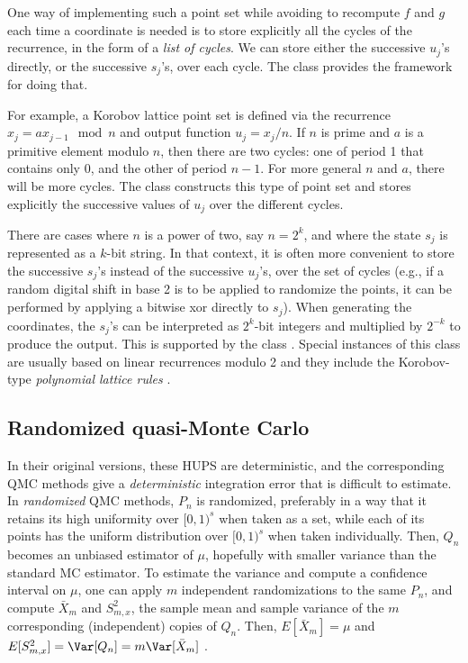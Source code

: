 One way of implementing such a point set while avoiding to recompute
$f$ and $g$ each time a coordinate is needed is to store explicitly
all the cycles of the recurrence, in the form of a \emph{list of cycles}.
We can store either the successive $u_j$'s directly, or the successive
$s_j$'s, over each cycle.
The class 
 provides the framework for doing that.

For example, a Korobov lattice point set is defined via the recurrence
$x_j = a x_{j-1} \mod n$ and output function $u_j = x_j/n$.
If $n$ is prime and $a$ is a primitive element modulo $n$, then there
are two cycles: one of period 1 that contains only 0, and
the other of period $n-1$.
For more general $n$ and $a$, there will be more cycles.
The class  
 constructs this type of point set and
stores explicitly the successive values of $u_j$ over the different cycles.

There are cases where $n$ is a power of two, say $n = 2^k$,
and where the state $s_j$ is represented as a $k$-bit string.
In that context, it is often more convenient to store the successive
$s_j$'s instead of the successive $u_j$'s, over the set of cycles
(e.g., if a random digital shift in base 2 is to be applied to
randomize the points, it can be performed by applying a bitwise xor
directly to $s_j$).
When generating the coordinates, the $s_j$'s can be interpreted as
$2^k$-bit integers and multiplied by $2^{-k}$ to produce the output.
This is supported by the class
 .
Special instances of this class are usually based on
linear recurrences modulo 2 and they include the Korobov-type
\emph{polynomial lattice rules}
\cite{rLEC99a,vLEC99a,rLEC02b,vLEM03a,rPAN04a}.


\subsection*{Randomized quasi-Monte Carlo}

In their original versions, these HUPS are deterministic, and the
corresponding QMC methods give a \emph{deterministic} integration error
that is difficult to estimate.
In \emph{randomized} QMC methods, $P_n$ is randomized, preferably in a
way that it retains its high uniformity over $[0,1)^s$ when taken as a set,
while each of its points has the uniform distribution over $[0,1)^s$
when taken individually.  Then, $Q_n$ becomes an unbiased estimator
of $\mu$, hopefully with smaller variance than the standard MC estimator.
To estimate the variance and compute a confidence interval on
$\mu$, one can apply $m$ independent randomizations to the same $P_n$,
and compute ${\bar X_m}$ and ${S_{m,x}^2}$, the sample mean and sample
variance of the $m$ corresponding (independent) copies of $Q_n$.
Then, $E[\bar X_m] = \mu$ and $E[S_{m,x}^2] = \Var[Q_n] = m\Var[\bar X_m]$
\cite{vLEC00b}.

